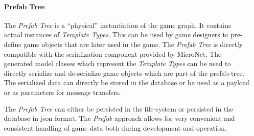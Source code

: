 \paragraph{Prefab Tree}

The \textit{Prefab Tree} is a ``physical'' instantiation of the game graph. It
contains actual instances of \textit{Template Types}. This can be used by game
designers to pre-define game objects that are later used in the game. The
\textit{Prefab Tree} is directly compatible with the serialization component
provided by MicroNet. The generated model classes which represent the
\textit{Template Types} can be used to directly serialize and de-serialize game
objects which are part of the prefab-tree. The serialized data can directly be
stored in the database or be used as a payload or as parameters for message
transfers.

The \textit{Prefab Tree} can either be persisted in the file-system or persisted in the
database in \gls{json} format. The \textit{Prefab} approach allows for very
convenient and consistent handling of game data both during development and
operation.

